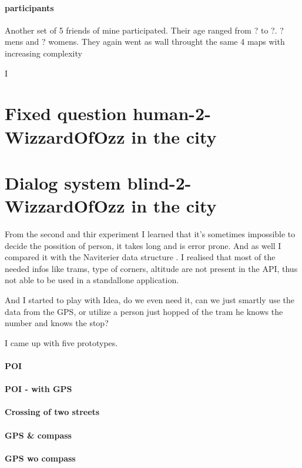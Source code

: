 \paragraph{participants}
Another set of 5 friends of mine participated. Their age ranged from ? to ?. ? mens and ? womens. They again went as wall throught the same 4 maps with increasing complexity

	
	 I 
	\section{Fixed question human-2-WizzardOfOzz in the city}
	\section{Dialog system blind-2-WizzardOfOzz in the city}
	From the second and thir experiment I learned that it's sometimes impossible to decide the possition of person, it takes long and is error prone. And as well I compared it with the Naviterier data structure \cite{naviterier-data}. 
	I realised that most of the needed infos like trams, type of corners, altitude are not present in the API, thus not able to be used in a standallone application.
	
	And I started to play with Idea, do we even need it, can we just smartly use the data from the GPS, or utilize a person just hopped of the tram he knows the number and knows the stop?
	
	I came up with five prototypes. 
	
	\paragraph{POI}
	\paragraph{POI - with GPS}
	\paragraph{Crossing of two streets}
	\paragraph{GPS \& compass}
	\paragraph{GPS wo compass}
	
